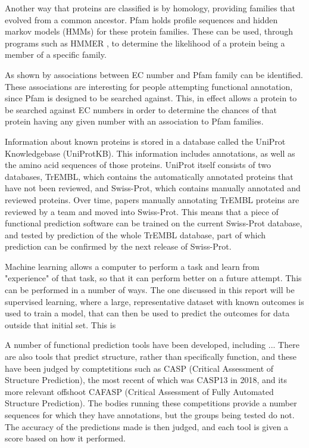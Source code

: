 \documentclass[12pt]{report}
\begin{document}
		Another way that proteins are classified is by homology, providing families that evolved from a common ancestor.  Pfam \citep{RefWorks:doc:5d6e641de4b0a51fb0eed90f} holds profile sequences and hidden markov models (HMMs) for these protein families. These can be used, through programs such as HMMER \citep{RefWorks:doc:5c8f77ece4b077fbbf563f6a}, to determine the likelihood of a protein being a member of a specific family. %
		
		As shown by \citep{RefWorks:doc:5d6f9c26e4b0ec3eed182252} associations between EC number and Pfam family can be identified.  These associations are interesting for people attempting functional annotation, since Pfam is designed to be searched against.  This, in effect allows a protein to be searched against EC numbers in order to determine the chances of that protein having any given number with an association to Pfam families. %
		
		Information about known proteins is stored in a database called the UniProt Knowledgebase (UniProtKB).  This information includes annotations, as well as the amino acid sequences of those proteins.  UniProt itself consists of two databases, TrEMBL, which contains the automatically annotated proteins that have not been reviewed, and Swiss-Prot, which contains manually annotated and reviewed proteins.  Over time, papers manually annotating TrEMBL proteins are reviewed by a team and moved into Swiss-Prot.  This means that a piece of functional prediction software can be trained on the current Swiss-Prot database, and tested by prediction of the whole TrEMBL database, part of which prediction can be confirmed by the next release of Swiss-Prot. %
		
		Machine learning allows a computer to perform a task and learn from "experience" of that task, so that it can perform better on a future attempt.  This can be performed in a number of ways.  The one discussed in this report will be supervised learning, where a large, representative dataset with known outcomes is used to train a model, that can then be used to predict the outcomes for data outside that initial set.  This is %
		
		A number of functional prediction tools have been developed, including ...  There are also tools that predict structure, rather than specifically function, and these have been judged by comptetitions such as CASP (Critical Assessment of Structure Prediction), the most recent of which was CASP13 in 2018, and its more relevant offshoot CAFASP (Critical Assessment of Fully Automated Structure Prediction).  The bodies running these competitions provide a number sequences for which they have annotations, but the groups being tested do not.  The accuracy of the predictions made is then judged, and each tool is given a score based on how it performed.%
		
\end{document}
